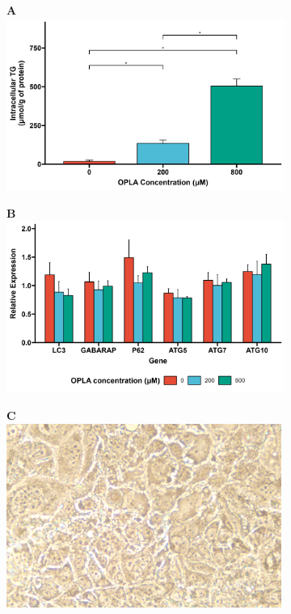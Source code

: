 \begin{figure}[h!]
     \begin{subfigure}[b]{0.49\textwidth}
         \textbf{A}
         \centering
         \includegraphics[width=\textwidth]{figures/ch3-Model Development/LFHF TG.png}
     \end{subfigure}  
     \hfill
     \begin{subfigure}[b]{0.49\textwidth}
         \textbf{B}
         \centering
         \includegraphics[width=\textwidth]{figures/ch3-Model Development/LFHF ATG genes.png}
     \end{subfigure}
     \hfill
      \begin{subfigure}[b]{0.49\textwidth}
         \textbf{C}
         \centering
         \includegraphics[width=\textwidth]{figures/ch3-Model Development/OPLA 0uM Picture.png}

\end{subfigure}
\end{figure}
